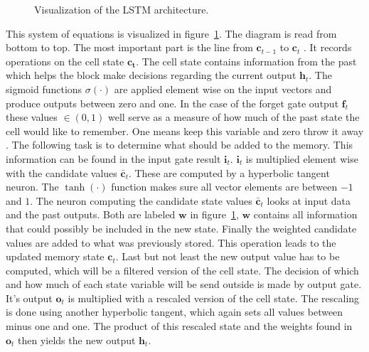 \begin{figure}

\caption{Visualization of the LSTM architecture.}
\label{fig:lstm}
\end{figure}
This system of equations is visualized in figure~\ref{fig:lstm}. The diagram is read from bottom to top. The most important part is the line from $\mathbf{c}_{t-1}$ to $\mathbf{c}_{t}$ \cite{Colah2015}. It records operations on the cell state $\mathbf{c_t}$. The cell state contains information from the past which helps the block make decisions regarding the current output $\mathbf{h}_t$. The sigmoid functions $\sigma(\cdot)$ are applied element wise on the input vectors and produce outputs between zero and one. In the case of the forget gate output $\mathbf{f}_t$ these values $\in (0,1)$ well serve as a measure of how much of the past state the cell would like to remember. One means keep this variable and zero throw it away \cite{Colah2015}. 
The following task is to determine what should be added to the memory. This information can be found in the input gate result $\mathbf{i}_t$. $\mathbf{i}_t$ is multiplied element wise with the candidate values $\mathbf{\bar{c}}_t$. These are computed by a hyperbolic tangent neuron.  The $\tanh(\cdot)$ function makes sure all vector elements are between $-1$ and $1$. The neuron computing the candidate state values $\mathbf{\bar{c}}_t$ looks at input data and the past outputs. Both are labeled $\mathbf{w}$ in figure~\ref{fig:lstm}, $\mathbf{w}$ contains all information that could possibly be included in the new state. Finally the weighted candidate values are added to what was previously stored. This operation leads to the updated memory state $\mathbf{c}_t$. 
Last but not least the new output value has to be computed, which will be a filtered version of the cell state. The decision of which and how much of each state variable will be send outside is made by output gate. It's output $\mathbf{o}_t$ is multiplied with a rescaled version of the cell state. The rescaling is done using another hyperbolic tangent, which again sets all values between minus one and one. The product of this rescaled state and the weights found in $\mathbf{o}_t$ then yields the new output $\mathbf{h}_t$. 

